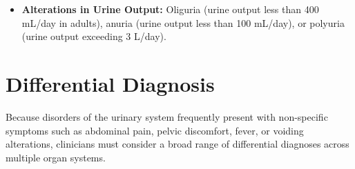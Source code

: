 \begin{itemize}
\begin{itemize}
        \item \textbf{Fluid Overload:} Peripheral pitting oedema (swelling of the ankles, feet, and shins), periorbital puffiness, hypertension, and in severe cases, pulmonary congestion presenting as dyspnoea and orthopnoea.
        \item \textbf{Uremic Syndrome:} Occurs in advanced renal failure due to the accumulation of nitrogenous waste products. Symptoms include profound fatigue, generalized pruritus (itching), anorexia, nausea, vomiting, metallic taste (dysgeusia), muscle twitching, asterixis (flapping tremor), and uremic encephalopathy (altered mental status, somnolence, confusion, or seizures).
    \end{itemize}
    \item \textbf{Alterations in Urine Output:} Oliguria (urine output less than 400 mL/day in adults), anuria (urine output less than 100 mL/day), or polyuria (urine output exceeding 3 L/day).
\end{itemize}

\section*{Differential Diagnosis}
Because disorders of the urinary system frequently present with non-specific symptoms such as abdominal pain, pelvic discomfort, fever, or voiding alterations, clinicians must consider a broad range of differential diagnoses across multiple organ systems.


